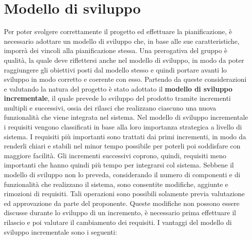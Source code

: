 \section{Modello di sviluppo}
	Per poter svolgere correttamente il progetto ed effettuare la pianificazione, è necessario adottare un modello di sviluppo che, in base alle sue caratteristiche, imporrà dei vincoli alla pianificazione stessa. Una prerogativa del gruppo è qualità, la quale deve riflettersi anche nel modello di sviluppo, in modo da poter raggiungere gli obiettivi posti dal modello stesso e quindi portare avanti lo sviluppo in modo corretto e coerente con esso.
	\newline
	Partendo da queste considerazioni e valutando la natura del progetto è stato adottato il \textbf{modello di sviluppo incrementale}, il quale prevede lo sviluppo del prodotto tramite incrementi multipli e successivi, ossia dei rilasci che realizzano ciascuno una nuova funzionalità che viene integrata nel sistema.
	\newline
	Nel modello di sviluppo incrementale i requisiti vengono classificati in base alla loro importanza strategica a livello di sistema. I requisiti più importanti sono trattati dai primi incrementi, in modo da renderli chiari e stabili nel minor tempo possibile per poterli poi soddisfare con maggiore facilità. Gli incrementi successivi coprono, quindi, requisiti meno importanti che hanno quindi più tempo per integrarsi col sistema.
	\newline
	Sebbene il modello di sviluppo non lo preveda, considerando il numero di componenti e di funzionalità che realizzano il sistema, sono consentite modifiche, aggiunte e rimozioni di requisiti. Tali operazioni sono possibili solamente previa valutazione ed approvazione da parte del proponente. Queste modifiche non possono essere discusse durante lo sviluppo di un incremento, è necessario prima effettuare il rilascio e poi valutare il cambiamento dei requisiti.
	\newline
	I vantaggi del modello di sviluppo incrementale sono i seguenti:
